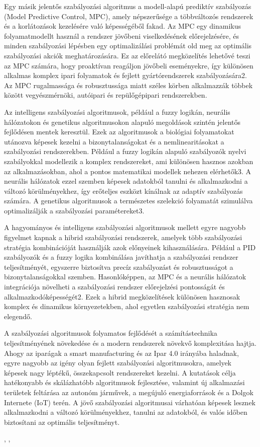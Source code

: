 Egy másik jelentős szabályozási algoritmus a modell-alapú prediktív szabályozás (Model Predictive Control, MPC), amely népszerűsége a többváltozós rendszerek és a korlátozások kezelésére való képességéből fakad. Az MPC egy dinamikus folyamatmodellt használ a rendszer jövőbeni viselkedésének előrejelzésére, és minden szabályozási lépésben egy optimalizálási problémát old meg az optimális szabályozási akciók meghatározására. Ez az előrelátó megközelítés lehetővé teszi az MPC számára, hogy proaktívan reagáljon jövőbeli eseményekre, így különösen alkalmas komplex ipari folyamatok és fejlett gyártórendszerek szabályozására2. Az MPC rugalmassága és robusztussága miatt széles körben alkalmazzák többek között vegyészmérnöki, autóipari és repülőgépipari rendszerekben.

Az intelligens szabályozási algoritmusok, például a fuzzy logikán, neurális hálózatokon és genetikus algoritmusokon alapuló megoldások szintén jelentős fejlődésen mentek keresztül. Ezek az algoritmusok a biológiai folyamatokat utánozva képesek kezelni a bizonytalanságokat és a nemlinearitásokat a szabályozási rendszerekben. Például a fuzzy logikán alapuló szabályozók nyelvi szabályokkal modellezik a komplex rendszereket, ami különösen hasznos azokban az alkalmazásokban, ahol a pontos matematikai modellek nehezen elérhetők3. A neurális hálózatok ezzel szemben képesek adatokból tanulni és alkalmazkodni a változó körülményekhez, így erőteljes eszközt kínálnak az adaptív szabályozás számára. A genetikus algoritmusok a természetes szelekció folyamatát szimulálva optimalizálják a szabályozási paramétereket3.

A hagyományos és intelligens szabályozási algoritmusok mellett egyre nagyobb figyelmet kapnak a hibrid szabályozási rendszerek, amelyek több szabályozási stratégia kombinációját használják azok előnyeinek kihasználására. Például a PID szabályozók és a fuzzy logika kombinálása javíthatja a szabályozási rendszer teljesítményét, egyszerre biztosítva precíz szabályozást és robusztusságot a bizonytalanságokkal szemben. Hasonlóképpen, az MPC és a neurális hálózatok integrációja növelheti a szabályozási rendszer előrejelzési pontosságát és alkalmazkodóképességét2. Ezek a hibrid megközelítések különösen hasznosak komplex és dinamikus környezetekben, ahol egyetlen szabályozási stratégia nem elegendő.

A szabályozási algoritmusok folyamatos fejlődését a számítástechnika teljesítményének növekedése és a modern rendszerek növekvő komplexitása hajtja. Ahogy az iparágak a smart manufacturing és az Ipar 4.0 irányába haladnak, egyre nagyobb az igény olyan fejlett szabályozási algoritmusokra, amelyek képesek nagy léptékű, összekapcsolt rendszereket kezelni. A kutatások célja hatékonyabb és skálázhatóbb algoritmusok fejlesztése, valamint új alkalmazási területek feltárása az autonóm járművek, a megújuló energiaforrások és a Dolgok Internete (IoT) terén. A jövő szabályozási algoritmusai várhatóan képesek lesznek alkalmazkodni a változó körülményekhez, tanulni az adatokból, és valós időben biztosítani az optimális teljesítményt.

\cite{lee2023review}, \cite{schwenzer2021review}, \cite{borase2021review}